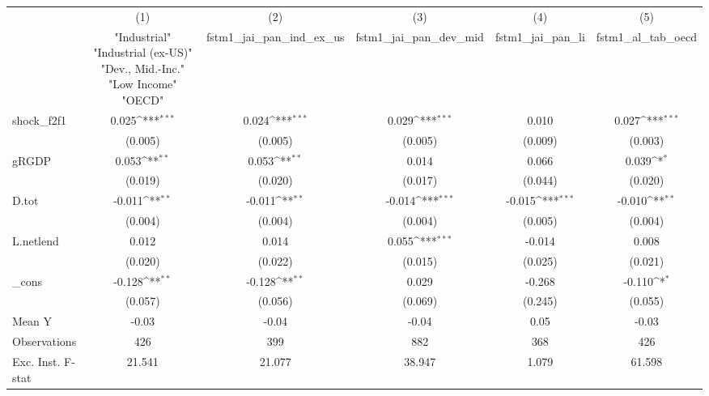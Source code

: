 {
\def\sym#1{\ifmmode^{#1}\else\(^{#1}\)\fi}
\begin{tabular}{l*{5}{c}}
\toprule
            &\multicolumn{1}{c}{(1)}&\multicolumn{1}{c}{(2)}&\multicolumn{1}{c}{(3)}&\multicolumn{1}{c}{(4)}&\multicolumn{1}{c}{(5)}\\
            &\multicolumn{1}{c}{ "Industrial" "Industrial (ex-US)" "Dev., Mid.-Inc." "Low Income" "OECD" }&\multicolumn{1}{c}{fstm1\_jai\_pan\_ind\_ex\_us}&\multicolumn{1}{c}{fstm1\_jai\_pan\_dev\_mid}&\multicolumn{1}{c}{fstm1\_jai\_pan\_li}&\multicolumn{1}{c}{fstm1\_al\_tab\_oecd}\\
\midrule
shock\_f2f1  &       0.025\sym{***}&       0.024\sym{***}&       0.029\sym{***}&       0.010         &       0.027\sym{***}\\
            &     (0.005)         &     (0.005)         &     (0.005)         &     (0.009)         &     (0.003)         \\
\addlinespace
gRGDP       &       0.053\sym{**} &       0.053\sym{**} &       0.014         &       0.066         &       0.039\sym{*}  \\
            &     (0.019)         &     (0.020)         &     (0.017)         &     (0.044)         &     (0.020)         \\
\addlinespace
D.tot       &      -0.011\sym{**} &      -0.011\sym{**} &      -0.014\sym{***}&      -0.015\sym{***}&      -0.010\sym{**} \\
            &     (0.004)         &     (0.004)         &     (0.004)         &     (0.005)         &     (0.004)         \\
\addlinespace
L.netlend   &       0.012         &       0.014         &       0.055\sym{***}&      -0.014         &       0.008         \\
            &     (0.020)         &     (0.022)         &     (0.015)         &     (0.025)         &     (0.021)         \\
\addlinespace
\_cons      &      -0.128\sym{**} &      -0.128\sym{**} &       0.029         &      -0.268         &      -0.110\sym{*}  \\
            &     (0.057)         &     (0.056)         &     (0.069)         &     (0.245)         &     (0.055)         \\
\midrule
Mean Y      &       -0.03         &       -0.04         &       -0.04         &        0.05         &       -0.03         \\
Observations&         426         &         399         &         882         &         368         &         426         \\
Exc. Inst. F-stat&      21.541         &      21.077         &      38.947         &       1.079         &      61.598         \\
\bottomrule
\end{tabular}
}
